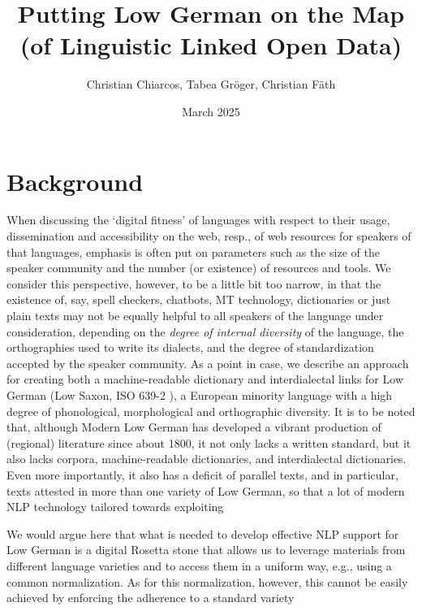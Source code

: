 \documentclass{article}
\title{Putting Low German on the Map (of Linguistic Linked Open Data)}
\author{Christian Chiarcos, Tabea Gröger, Christian Fäth}
\date{March 2025}
\begin{document}
\maketitle

\begin{abstract}
    
\end{abstract}

\section{Background}

When discussing the `digital fitness' of languages \cite{soria2016fostering}
with respect to their usage, dissemination and accessibility on the web, resp., of web resources for speakers of that languages, emphasis is often put on parameters such as the size of the speaker community and the number (or existence) of resources and tools. We consider this perspective, however, to be a little bit too narrow, in that the existence of, say, spell checkers, chatbots, MT technology, dictionaries or just plain texts may not be equally helpful to all speakers of the language under consideration, depending on the \emph{degree of internal diversity} of the language, the orthographies used to write its dialects, and the degree of standardization accepted by the speaker community. As a point in case, we describe an approach for creating both a machine-readable dictionary and interdialectal links for Low German (Low Saxon, ISO 639-2 ), a European minority language with a high degree of phonological, morphological and orthographic diversity. It is to be noted that, although Modern Low German has developed a vibrant production of (regional) literature since about 1800, it not only lacks a written standard, but it also lacks corpora, machine-readable dictionaries, and interdialectal dictionaries. Even more importantly, it also has a deficit of parallel texts, and in particular, texts attested in more than one variety of Low German, so that a lot of modern NLP technology tailored towards exploiting 

We would argue here that what is needed to develop effective NLP support for Low German is a digital Rosetta stone that allows us to leverage materials from different language varieties and to access them in a uniform way, e.g., using a common normalization. As for this normalization, however, this cannot be easily achieved by enforcing the adherence to a standard variety
\end{document}
